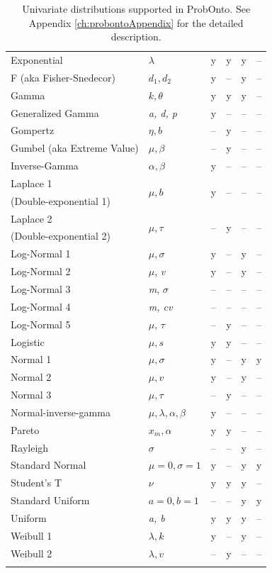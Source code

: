 \begin{center}
\begin{longtable}{l | lcccc}
Exponential			& $\lambda$		&	y	&	y	&	y	&  -- \\
F (aka Fisher-Snedecor)	& $d_1, d_2$		&	y	& --  &	y	&  -- \\
Gamma				& $k, \theta$		&	y	&	y	&	y	&  -- \\
Generalized Gamma	& \emph{a, d, p}	&	y	& --  & --  & --	  \\
Gompertz				& $\eta, b$		& --  &	y	& --  & --	  \\
Gumbel (aka Extreme Value)	& $\mu, \beta$	& --  &	y 	& --  & -- \\ 
Inverse-Gamma		& $\alpha, \beta$	&	y	& --  & --  &  -- \\
Laplace 1				& \multirow{2}{*}{$\mu, b$} &	\multirow{2}{*}{y}	&	\multirow{2}{*}{--}	& \multirow{2}{*}{--}  & \multirow{2}{*}{--} \\ [-0.5ex]
(Double-exponential 1) \\
Laplace 2				& \multirow{2}{*}{$\mu, \tau$} &	\multirow{2}{*}{--}	&	\multirow{2}{*}{y}	& \multirow{2}{*}{--}  & \multirow{2}{*}{--} \\ [-0.5ex]
(Double-exponential 2) \\[0.5ex]
Log-Normal 1			& $\mu, \sigma$	&	y	&	--	&	y	&  -- \\
Log-Normal 2			& $\mu$, \textit{v}	&	y	&	--	&	y	&  -- \\
Log-Normal 3			& \emph{m}, $\sigma$	&	--	&	--	&	--	&  -- \\
Log-Normal 4			& \emph{m, cv}		& 	--	&	--	&	--	&  -- \\
Log-Normal 5			& $\mu$, $\tau$	& 	--	&	y	&	--	&  -- \\[0.5ex]
Logistic				& $\mu, s$		&	y	&	y	& --  &  -- \\[0.5ex]
Normal 1				& $\mu, \sigma$	&	y	&	--	&	y	& y  \\
Normal 2				& $\mu, v$		&	y	&	--	&	y	&  -- \\
Normal 3				& $\mu, \tau$		&	--	&	y	&	--	&  -- \\[0.5ex]
Normal-inverse-gamma	& $\mu, \lambda, \alpha, \beta$	& y	& --  & --  &  -- \\
Pareto				& $x_m, \alpha$	& y	& y	& --  &  -- \\
Rayleigh				& $\sigma$		& --  & --  & y	&  -- \\
Standard Normal 		& $\mu\!=\!0, \sigma\!=\!1$	& y & -- &	 y & y  \\
Student's T			& $\nu$			& y	& y	& y	&  -- \\
Standard Uniform		& $a\!=\!0, b\!=\!1$		& --	& --	& y & y  \\
Uniform				&  \emph{a, b}		& y	& y	& y		& --  \\
Weibull 1				& $\lambda, k$		& y	& --	& y	&  -- \\
Weibull 2				& $\lambda, v$		& --	& y	& --	&  -- \\
   \hline 
\caption{Univariate distributions supported in ProbOnto. See Appendix \ref{ch:probontoAppendix} 
for the detailed description.}
\label{figTable:univariates}
\vspace{-2.5em}
\end{longtable}
\end{center}

